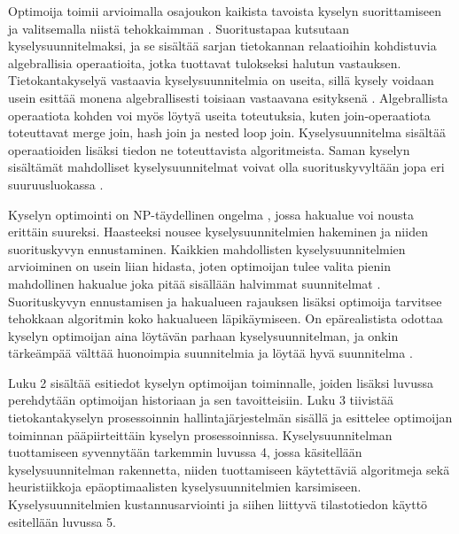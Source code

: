 \documentclass[finnish]{tktltiki2}
\theoremstyle{definition}
\theoremstyle{remark}
\begin{document}
Optimoija toimii arvioimalla osajoukon kaikista tavoista kyselyn suorittamiseen ja valitsemalla niistä tehokkaimman \cite{selinger1979access}. Suoritustapaa kutsutaan kyselysuunnitelmaksi, ja se sisältää sarjan tietokannan relaatioihin kohdistuvia algebrallisia operaatioita, jotka tuottavat tulokseksi halutun vastauksen. Tietokantakyselyä vastaavia kyselysuunnitelmia on useita, sillä kysely voidaan usein esittää monena algebrallisesti toisiaan vastaavana esityksenä \cite{jarke1984}. Algebrallista operaatiota kohden voi myös löytyä useita toteutuksia, kuten join-operaatiota toteuttavat merge join, hash join ja nested loop join. Kyselysuunnitelma sisältää operaatioiden lisäksi tiedon ne toteuttavista algoritmeista. Saman kyselyn sisältämät mahdolliset kyselysuunnitelmat voivat olla suorituskyvyltään jopa eri suuruusluokassa \cite{ioannidis1996query, oracle2013refman}. 


Kyselyn optimointi on NP-täydellinen ongelma \cite{ibaraki1984optimal}, jossa hakualue voi nousta erittäin suureksi. Haasteeksi nousee kyselysuunnitelmien hakeminen ja niiden suorituskyvyn ennustaminen. Kaikkien mahdollisten kyselysuunnitelmien arvioiminen on usein liian hidasta, joten optimoijan tulee valita pienin mahdollinen hakualue joka pitää sisällään halvimmat suunnitelmat \cite{chaudhuri1998}. Suorituskyvyn ennustamisen ja hakualueen rajauksen lisäksi optimoija tarvitsee tehokkaan algoritmin koko hakualueen läpikäymiseen. On epärealistista odottaa kyselyn optimoijan aina löytävän parhaan kyselysuunnitelman, ja onkin tärkeämpää välttää huonoimpia suunnitelmia ja löytää hyvä suunnitelma \cite{ramakrishnan2003database}. 

Luku 2 sisältää esitiedot kyselyn optimoijan toiminnalle, joiden lisäksi luvussa perehdytään optimoijan historiaan ja sen tavoitteisiin. Luku 3 tiivistää tietokantakyselyn prosessoinnin hallintajärjestelmän sisällä ja esittelee optimoijan toiminnan pääpiirteittäin kyselyn prosessoinnissa. Kyselysuunnitelman tuottamiseen syvennytään tarkemmin luvussa 4, jossa käsitellään kyselysuunnitelman rakennetta, niiden tuottamiseen käytettäviä algoritmeja sekä heuristiikkoja epäoptimaalisten kyselysuunnitelmien karsimiseen. Kyselysuunnitelmien kustannusarviointi ja siihen liittyvä tilastotiedon käyttö esitellään luvussa 5. 
\end{document}
